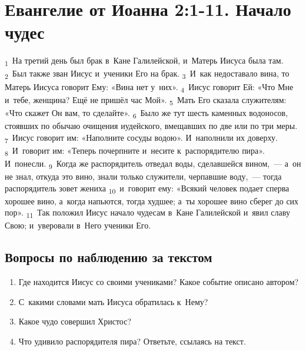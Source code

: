 \documentclass[a4paper,12pt]{article}
\begin{document}

\section{Евангелие от Иоанна 2:1-11. Начало чудес}

\textsubscript{1}~На третий день был брак в~Кане Галилейской, и~Матерь Иисуса была там. \textsubscript{2}~Был также зван Иисус и~ученики Его на брак. \textsubscript{3}~И~как недоставало вина, то Матерь Иисуса говорит Ему: «Вина нет у~них». \textsubscript{4}~Иисус говорит Ей: «Что Мне и~тебе, женщина? Ещё не пришёл час Мой». \textsubscript{5}~Мать Его сказала служителям: «Что скажет Он вам, то сделайте». \textsubscript{6}~Было же тут шесть каменных водоносов, стоявших по обычаю очищения иудейского, вмещавших по две или по три меры. \textsubscript{7}~Иисус говорит им: «Наполните сосуды водою». И~наполнили их доверху. \textsubscript{8}~И~говорит им: «Теперь почерпните и~несите к~распорядителю пира». И~понесли. \textsubscript{9}~Когда же распорядитель отведал воды, сделавшейся вином,~--- а~он не знал, откуда это вино, знали только служители, черпавшие воду,~--- тогда распорядитель зовет жениха \textsubscript{10}~и~говорит ему: «Всякий человек подает сперва хорошее вино, а~когда напьются, тогда худшее; а~ты хорошее вино сберег до сих пор». \textsubscript{11}~Так положил Иисус начало чудесам в~Кане Галилейской и~явил славу Свою; и~уверовали в~Него ученики Его.

\subsection*{Вопросы по наблюдению за текстом}
\begin{enumerate}
    \item Где находится Иисус со своими учениками? Какое событие описано автором? 
    
    \myline
    
    \myline
    \item С~какими словами мать Иисуса обратилась к~Нему? 
    
    \myline
    
    \myline
    \item Какое чудо совершил Христос? 
    
    \myline
    
    \myline
    \item Что удивило распорядителя пира? Ответьте, ссылаясь на текст.

    \myline
    
    \myline
\end{enumerate}
\end{document}
